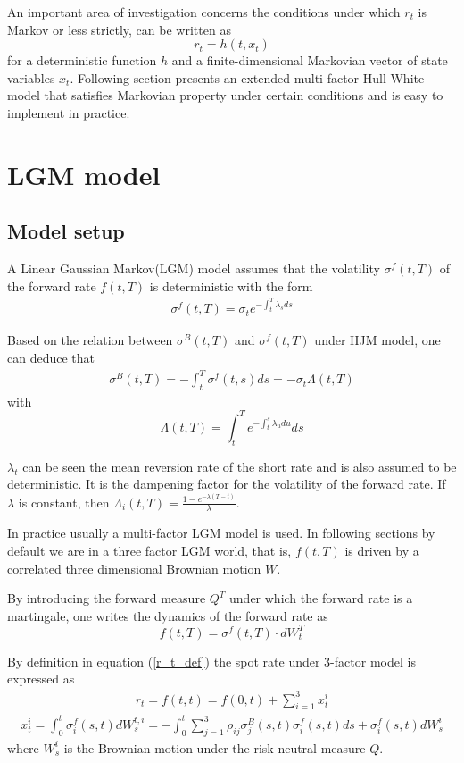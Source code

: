 \documentclass[10pt]{article}
\theoremstyle{plain}
\numberwithin{equation}{section}
\numberwithin{table}{section}
\begin{document}
An important area of investigation concerns the conditions under which $%
r_{t} $ is Markov or less strictly, can be written as
\[
    r_{t} = h(t, x_{t})
\]
for a deterministic function $h$ and a finite-dimensional Markovian vector
of state variables $x_{t}$. Following section presents an extended multi
factor Hull-White model that satisfies Markovian property under certain
conditions and is easy to implement in practice.


\section{LGM model}


\subsection{Model setup}
A Linear Gaussian Markov(LGM) model assumes
that the volatility $\sigma^f(t,T)$ of the forward rate $f(t,T)$ is deterministic with the form
\begin{eqnarray}
    \sigma^f(t,T) = \sigma_{t} e^{-\int_{t}^T\lambda _{s}ds}
    \label{SF_def}
\end{eqnarray}

Based on the relation between $\sigma^B(t,T)$ and $\sigma^f(t,T)$ under HJM model, one can deduce that
\begin{eqnarray}
    \sigma^B(t,T) = -\int_t^T \sigma^f(t,s) ds = -\sigma_{t} \Lambda (t,T)  \label{SigmaB_def}
\end{eqnarray}
with
\[
    \Lambda (t,T)=\int_{t}^{T}e^{-\int_{t}^{s}\lambda _{u}du}ds
    \label{lamda_def}    
\]

$\lambda_{t}$ can be seen the mean reversion rate of the short rate and is
also assumed to be deterministic. It is the dampening factor for the
volatility of the forward rate. If $\lambda$ is constant, then $\Lambda_{i}
(t,T)= \frac{1-e^{-\lambda(T-t)}}{\lambda}$.

In practice usually a multi-factor LGM model is used. In following sections by default we are in 
a three factor LGM world, that is, $f(t,T)$ is driven by a correlated three dimensional Brownian motion
$W$.

By introducing the forward measure $Q^T$ under which the forward rate is a
martingale, one writes the dynamics of the forward rate as 
\[
    f(t,T)=\sigma^f(t,T)\cdot dW^T_{t}    
\]

By definition in equation (\ref{r_t_def}) the spot rate under 3-factor model
is expressed as
\begin{eqnarray}
r_{t} = f(t,t)=f(0,t)+ \sum^{3}_{i=1}x_{t}^i  \label{r_int}
\end{eqnarray}
\begin{eqnarray}
    x^i_{t} = \int_{0}^t \sigma_{i}^f(s,t)dW_{s}^{t,i} =
    -\int_{0}^t\sum_{j=1}^3\rho_{ij}\sigma_{j}^B(s,t)\sigma^f_{i}(s,t)ds+
    \sigma^f_{i}(s,t)dW_{s}^{i}  
    \label{x_int}
\end{eqnarray}
where $W_{s}^{i}$ is the Brownian motion under the risk neutral measure $Q$.
\end{document}
